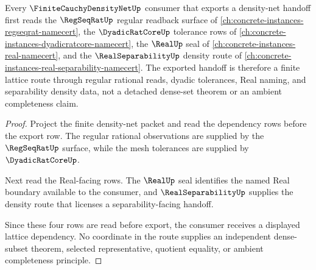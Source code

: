 \begin{theorem}
\label{thm:finite-cauchy-density-net-regseqrat-real-lattice-route}
Every $\FiniteCauchyDensityNetUp$ consumer that exports a density-net handoff first reads the $\RegSeqRatUp$ regular readback surface of \autoref{ch:concrete-instances-regseqrat-namecert}, the $\DyadicRatCoreUp$ tolerance rows of \autoref{ch:concrete-instances-dyadicratcore-namecert}, the $\RealUp$ seal of \autoref{ch:concrete-instances-real-namecert}, and the $\RealSeparabilityUp$ density route of \autoref{ch:concrete-instances-real-separability-namecert}. The exported handoff is therefore a finite lattice route through regular rational reads, dyadic tolerances, Real naming, and separability density data, not a detached dense-set theorem or an ambient completeness claim.
\end{theorem}
\begin{proof}
Project the finite density-net packet and read the dependency rows before the export row. The regular rational observations are supplied by the $\RegSeqRatUp$ surface, while the mesh tolerances are supplied by $\DyadicRatCoreUp$.

Next read the Real-facing rows. The $\RealUp$ seal identifies the named Real boundary available to the consumer, and $\RealSeparabilityUp$ supplies the density route that licenses a separability-facing handoff.

Since these four rows are read before export, the consumer receives a displayed lattice dependency. No coordinate in the route supplies an independent dense-subset theorem, selected representative, quotient equality, or ambient completeness principle.
\end{proof}
